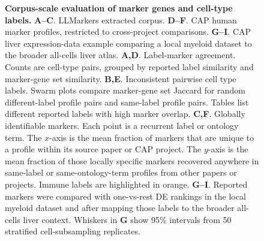 \begin{figure}[ht!]
  \centering
  
  \caption{\textbf{Corpus-scale evaluation of marker genes and cell-type labels.} \textbf{A--C}. LLMarkers extracted corpus. \textbf{D--F}. CAP human marker profiles, restricted to cross-project comparisons. \textbf{G--I}. CAP liver expression-data example comparing a local myeloid dataset to the broader all-cells liver atlas. \textbf{A,D}. Label-marker agreement. Counts are cell-type pairs, grouped by reported label similarity and marker-gene set similarity. \textbf{B,E}. Inconsistent pairwise cell type labels. Swarm plots compare marker-gene set Jaccard for random different-label profile pairs and same-label profile pairs. Tables list different reported labels with high marker overlap. \textbf{C,F}. Globally identifiable markers. Each point is a recurrent label or ontology term. The $x$-axis is the mean fraction of markers that are unique to a profile within its source paper or CAP project. The $y$-axis is the mean fraction of those locally specific markers recovered anywhere in same-label or same-ontology-term profiles from other papers or projects. Immune labels are highlighted in orange. \textbf{G--I}. Reported markers were compared with one-vs-rest DE rankings in the local myeloid dataset and after mapping those labels to the broader all-cells liver context. Whiskers in \textbf{G} show 95\% intervals from 50 stratified cell-subsampling replicates.}
  \label{fig:cross_study_unification}%
\end{figure}
